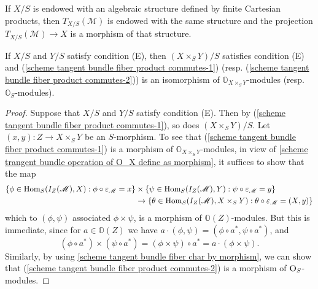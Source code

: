 \begin{corollary}\label{scheme tangent bundle induce algebraic structure}
If $X/S$ is endowed with an algebraic structure defined by finite Cartesian products, then $T_{X/S}(\mathscr{M})$ is endowed with the same structure and the projection $T_{X/S}(\mathscr{M})\to X$ is a morphism of that structure.
\end{corollary}

\begin{proposition}\label{scheme tangent bundle condition (E) fiber product commutes}
If $X/S$ and $Y/S$ satisfy condition (E), then $(X\times_SY)/S$ satisfies condition (E) and (\ref{scheme tangent bundle fiber product commutes-1}) (resp. (\ref{scheme tangent bundle fiber product commutes-2})) is an isomorphism of $\mathbb{O}_{X\times_SY}$-modules (resp. $\mathbb{O}_S$-modules).
\end{proposition}
\begin{proof}
Suppose that $X/S$ and $Y/S$ satisfy condition (E). Then by (\ref{scheme tangent bundle fiber product commutes-1}), so does $(X\times_SY)/S$. Let $(x,y):Z\to X\times_SY$ be an $S$-morphism. To see that (\ref{scheme tangent bundle fiber product commutes-1}) is a morphism of $\mathbb{O}_{X\times_SY}$-modules, in view of \cref{scheme trangent bundle operation of O_X define as morphism}, it suffices to show that the map
\begin{align*}
\{\phi\in\mathrm{Hom}_S(I_Z(\mathscr{M}),X):\phi\circ\varepsilon_\mathscr{M}=x\}&\times\{\psi\in\mathrm{Hom}_S(I_Z(\mathscr{M}),Y):\psi\circ\varepsilon_\mathscr{M}=y\}\\
&\to\{\theta\in\mathrm{Hom}_S(I_Z(\mathscr{M}),X\times_SY):\theta\circ\varepsilon_\mathscr{M}=(X,y)\}
\end{align*}
which to $(\phi,\psi)$ associated $\phi\times\psi$, is a morphism of $\mathbb{O}(Z)$-modules. But this is immediate, since for $a\in\mathbb{O}(Z)$ we have $a\cdot(\phi,\psi)=(\phi\circ a^*,\psi\circ a^*)$, and 
\[(\phi\circ a^*)\times(\psi\circ a^*)=(\phi\times\psi)\circ a^*=a\cdot(\phi\times\psi).\]
Similarly, by using \cref{scheme tangent bundle fiber char by morphism}, we can show that (\ref{scheme tangent bundle fiber product commutes-2}) is a morphism of $\mathrm{O}_{S}$-modules.
\end{proof}


